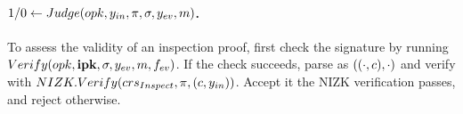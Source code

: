 \paragraph{$1/0 \gets Judge(opk,y_{in},\pi,\sigma,y_{ev},m)$.} %
To assess the validity of an inspection proof, first check the signature
by running $Verify(opk,\mathbf{ipk}, \sigma,y_{ev},m,f_{ev})$. If the check succeeds,
parse \sig as $((\cdot,c),\cdot)$ and verify \NIZKproof with $NIZK.Verify
(crs_{Inspect},\pi,(c,y_{in}))$. Accept it the NIZK verification
passes, and reject otherwise.

